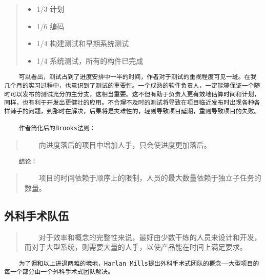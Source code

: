 \documentclass[11pt]{article}
\providecommand{\tightlist}{%
      \setlength{\itemsep}{0pt}\setlength{\parskip}{0pt}}
\begin{document}
\begin{quote}
\begin{itemize}
\tightlist
\item
  1/3 计划
\item
  1/6 编码
\item
  1/4 构建测试和早期系统测试
\item
  1/4 系统测试，所有的构件已完成
\end{itemize}
\end{quote}

\begin{verbatim}
    可以看出，测试占到了进度安排中一半的时间，作者对于测试的重视程度可见一斑。在我几个月的实习过程中，也意识到了测试的重要性。一个成熟的软件负责人，一定能够保证一个随时可以发布的测试充分的主分支，这相当重要。这不但有助于负责人更有效地估算时间和计划，同样，也有利于开发出更健壮的应用。不合理不及时的测试将导致在项目临近发布时出现各种各样棘手的问题，到那时在解决，后果将是灾难性的，轻则导致项目延期，重则导致项目的失败。
    
    作者简化后的Brooks法则：
\end{verbatim}

\begin{quote}
  向进度落后的项目中增加人手，只会使进度更加落后。
\end{quote}

\begin{verbatim}
    结论：
\end{verbatim}

\begin{quote}
  项目的时间依赖于顺序上的限制，人员的最大数量依赖于独立子任务的数量。
\end{quote}

\hypertarget{ux5916ux79d1ux624bux672fux961fux4f0d}{%
\subsection{外科手术队伍}\label{ux5916ux79d1ux624bux672fux961fux4f0d}}

\begin{quote}
  对于效率和概念的完整性来说，最好由少数干练的人员来设计和开发，而对于大型系统，则需要大量的人手，以使产品能在时间上满足要求。
\end{quote}

\begin{verbatim}
    为了调和以上进退两难的境地，Harlan Mills提出外科手术式团队的概念——大型项目的每一个部分由一个外科手术式团队解决。
\end{verbatim}
\end{document}
